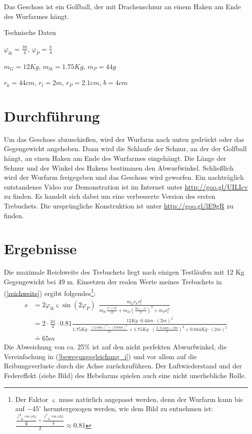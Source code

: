 Das Geschoss ist ein Golfball, der mit Drachenschnur an einem Haken am Ende des Wurfarmes hängt.

\begin{framed}
Technische Daten

$\varphi_{lk}=\frac{3\pi}{4}$, 
$\varphi_P=\frac{\pi}{4}$

$m_G=12\unit{Kg}$, 
$m_{lk}=1.75\unit{Kg}$, 
$m_P=44\unit{g}$

$r_k=44\unit{cm}$, 
$r_l=2\unit{m}$,
$r_P=2.1\unit{cm}$, 
$b=4\unit{cm}$
\end{framed}

\section{Durchführung}
Um das Geschoss abzuschießen, wird der Wurfarm nach unten gedrückt oder das Gegengewicht angehoben. Dann wird die Schlaufe der Schnur, an der der Golfball hängt, an einen Haken am Ende des Wurfarmes eingehängt. Die Länge der Schnur und der Winkel des Hakens bestimmen den Abwurfwinkel. Schließlich wird der Wurfarm freigegeben und das Geschoss wird geworfen. Ein nachträglich entstandenes Video zur Demonstration ist im Internet unter \url{http://goo.gl/UILIcv} zu finden. Es handelt sich dabei um eine verbesserte Version des ersten Trebuchets. Die ursprüngliche Konstruktion ist unter \url{http://goo.gl/lE9gR} zu finden.





\section{Ergebnisse}
Die maximale Reichweite des Trebuchets liegt nach einigen Testläufen mit 12 Kg Gegengewicht bei 49 m. Einsetzen der realen Werte meines Trebuchets in (\ref{reichweite}) ergibt folgendes\footnote{Der Faktor $\varsigma$ muss natürlich angepasst werden, denn der Wurfarm kann bis auf $-45^\circ$ heruntergezogen werden, wie dem Bild zu entnehmen ist: 
$\frac{ \frac{
 		\int_
 			{-\frac{\pi}{4}} ^\frac{\pi}{2} 
 			\cos{\varphi}\mathrm d\varphi}{
 			\frac{3\pi}{4}
 		} +
 		 \frac{
 		\int_
 			{-\frac{\pi}{4}} ^0
 			\cos{\varphi}\mathrm d\varphi
 		}{
 			\frac{\pi}{4}
 		}}{2}\approx 0.81 $
}:
\begin{align*}
s &= 2 \varphi_{lk} \varsigma \sin{(2\varphi_P)} \ \ \frac{ m_G  r_kr_l^2}
		{m_{lk} \frac{r^2+b^2}{12} + m_{lk} (\frac{3r_k-r_l}{2})^2+m_P r_l^2}\\
		&=2\cdot \frac{3\pi}{4} \cdot 0.81 \frac{ 12\unit{Kg}\cdot 0.44\unit{m}\cdot (2\unit{m})^2}
		{1.75\unit{Kg} \cdot\frac{(2.44\unit{m})^2+(0.04\unit{m})^2}{12} + 1.75\unit{Kg} \cdot(\frac{3\cdot0.44\unit{m}-2\unit{m}}{2})^2+0.044\unit{Kg} \cdot(2\unit{m})^2}\\
		&\doteq 65 \unit{m}
\end{align*}
Die Abweichung von ca. 25\% ist auf den nicht perfekten Abwurfwinkel, die Vereinfachung in (\ref{bewegungsgleichung_i}) und vor allem auf die Reibungsverluste durch die Achse zurückzuführen. Der Luftwiederstand und der Federeffekt (siehe Bild) des Hebelarms spielen auch eine nicht unerhebliche Rolle.

